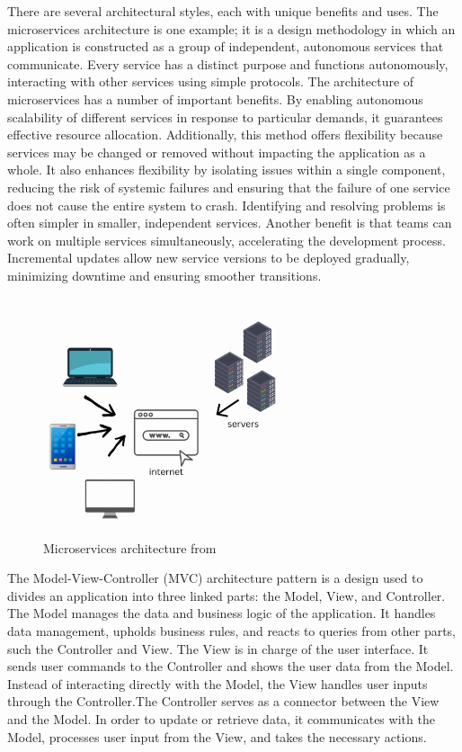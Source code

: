     There are several architectural styles, each with unique benefits and uses. The microservices architecture is one example; it is a design methodology in which an application is constructed as a group of independent, autonomous services that communicate. Every service has a distinct purpose and functions autonomously, interacting with other services using simple protocols. The architecture of microservices has a number of important benefits. By enabling autonomous scalability of different services in response to particular demands, it guarantees effective resource allocation. Additionally, this method offers flexibility because services may be changed or removed without impacting the application as a whole. It also enhances flexibility by isolating issues within a single component, reducing the risk of systemic failures and ensuring that the failure of one service does not cause the entire system to crash. Identifying and resolving problems is often simpler in smaller, independent services. Another benefit is that teams can work on multiple services simultaneously, accelerating the development process. Incremental updates allow new service versions to be deployed gradually, minimizing downtime and ensuring smoother transitions.
    \cite{Vicki}
    \begin{figure}[H]
        \centering
        \includegraphics[width=7cm]{chapters/2/figures/eb6b7a926564d8e2d83f58f00.jpg}
        \caption[Microservices architecture]{Microservices architecture  from~\cite{Vicki}}
        \label{fig:microservices-architecture}
    \end{figure}

    The Model-View-Controller (MVC) architecture pattern is a design used to divides an application into three linked parts: the Model, View, and Controller. The Model manages the data and business logic of the application. It handles data management, upholds business rules, and reacts to queries from other parts, such the Controller and View. The View is in charge of the user interface. It sends user commands to the Controller and shows the user data from the Model. Instead of interacting directly with the Model, the View handles user inputs through the Controller.The Controller serves as a connector between the View and the Model. In order to update or retrieve data, it communicates with the Model, processes user input from the View, and takes the necessary actions.
    \cite{GeeksforGeeks}

